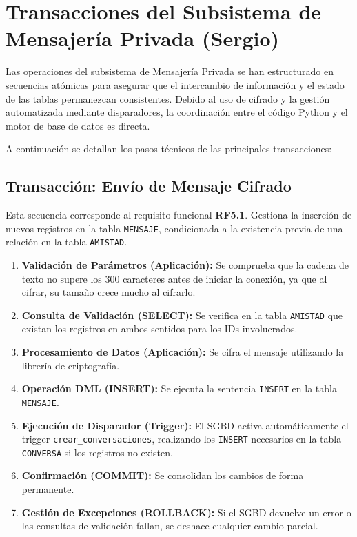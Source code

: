 \section{Transacciones del Subsistema de Mensajería Privada (Sergio)}

Las operaciones del subsistema de Mensajería Privada se han estructurado en secuencias atómicas para asegurar que el intercambio de información y el estado de las tablas permanezcan consistentes. Debido al uso de cifrado y la gestión automatizada mediante disparadores, la coordinación entre el código Python y el motor de base de datos es directa.

A continuación se detallan los pasos técnicos de las principales transacciones:

\subsection{Transacción: Envío de Mensaje Cifrado}
Esta secuencia corresponde al requisito funcional \textbf{RF5.1}. Gestiona la inserción de nuevos registros en la tabla \texttt{MENSAJE}, condicionada a la existencia previa de una relación en la tabla \texttt{AMISTAD}.

\begin{enumerate}
    \item \textbf{Validación de Parámetros (Aplicación):} Se comprueba que la cadena de texto no supere los 300 caracteres antes de iniciar la conexión, ya que al cifrar, su tamaño crece mucho al cifrarlo.
    \item \textbf{Consulta de Validación (SELECT):} Se verifica en la tabla \texttt{AMISTAD} que existan los registros en ambos sentidos para los IDs involucrados.
    \item \textbf{Procesamiento de Datos (Aplicación):} Se cifra el mensaje utilizando la librería de criptografía.
    \item \textbf{Operación DML (INSERT):} Se ejecuta la sentencia \texttt{INSERT} en la tabla \texttt{MENSAJE}.
    \item \textbf{Ejecución de Disparador (Trigger):} El SGBD activa automáticamente el trigger \texttt{crear\_conversaciones}, realizando los \texttt{INSERT} necesarios en la tabla \texttt{CONVERSA} si los registros no existen.
    \item \textbf{Confirmación (COMMIT):} Se consolidan los cambios de forma permanente.
    \item \textbf{Gestión de Excepciones (ROLLBACK):} Si el SGBD devuelve un error o las consultas de validación fallan, se deshace cualquier cambio parcial.
\end{enumerate}

